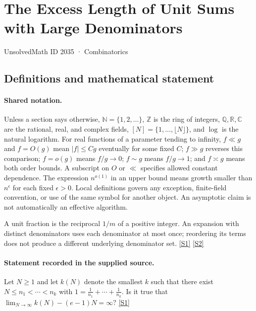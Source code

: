 \documentclass[11pt,a4paper]{article}
\newcommand{\N}{\mathbb{N}}
\newcommand{\Z}{\mathbb{Z}}
\newcommand{\Q}{\mathbb{Q}}
\newcommand{\R}{\mathbb{R}}
\newcommand{\C}{\mathbb{C}}
\newcommand{\sref}[2]{\hyperlink{source:#1:#2}{[S#2]}}
\begin{document}

\setcounter{section}{2034}

\section{The Excess Length of Unit Sums with Large Denominators}\label{2035}

{\small\sffamily UnsolvedMath ID 2035 · Combinatorics}

\subsection{Definitions and mathematical statement}

\paragraph{Shared notation.}Unless a section says otherwise, $\N=\{1,2,\ldots\}$,
$\Z$ is the ring of integers, $\Q,\R,\C$ are the rational, real, and complex
fields, $[N]=\{1,\ldots,\lfloor N\rfloor\}$, and $\log$ is the natural
logarithm. For real functions of a parameter tending to infinity,
$f\ll g$ and $f=O(g)$ mean $|f|\leq Cg$ eventually for some fixed $C$;
$f\gg g$ reverses this comparison; $f=o(g)$ means $f/g\to0$;
$f\sim g$ means $f/g\to1$; and $f\asymp g$ means both order bounds.
A subscript on $O$ or $\ll$ specifies allowed constant dependence.
The expression $n^{o(1)}$ in an upper bound means growth smaller than
$n^\epsilon$ for each fixed $\epsilon>0$. Local definitions govern any
exception, finite-field convention, or use of the same symbol for another
object. An asymptotic claim is not automatically an effective algorithm.



A unit fraction is the reciprocal $1/m$ of a positive integer. An expansion with distinct denominators uses each denominator at most once; reordering its terms does not produce a different underlying denominator set. \sref{2035}{1} \sref{2035}{2}

\paragraph{Statement recorded in the supplied source.}
Let $N\geq 1$ and let $k(N)$ denote the smallest $k$ such that there exist $N\leq n_1<\cdots <n_k$ with $ 1=\frac{1}{n_1}+\cdots+\frac{1}{n_k}. $ Is it true that $ \lim_{N\to \infty} k(N)-(e-1)N=\infty? $ \sref{2035}{1}
\end{document}
